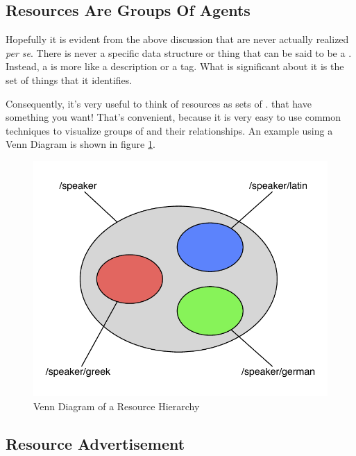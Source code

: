 \subsection{Resources Are Groups Of Agents}

Hopefully it is evident from the above discussion that \resources{} are never actually realized \emph{per se}.  There is never a specific data structure or thing that can be said to be a \resource.  Instead, a \resource{} is more like a description or a tag.  What is significant about it is the set of things that it identifies.

Consequently, it's very useful to think of resources as sets of \agents{}.  \Agents{} that have something you want!  That's convenient, because it is very easy to use common techniques to visualize groups of \agents{} and their relationships.  An example using a Venn Diagram is shown in figure \ref{fig:res-example1}.

\begin{figure}
	\begin{center}\includegraphics[width=\myfigwidth,height=\myfigheight,keepaspectratio]{figs/omnigraffle/res_example1}\end{center}
	\caption{Venn Diagram of a Resource Hierarchy}\label{fig:res-example1}
\end{figure}

\subsection{Resource Advertisement}

